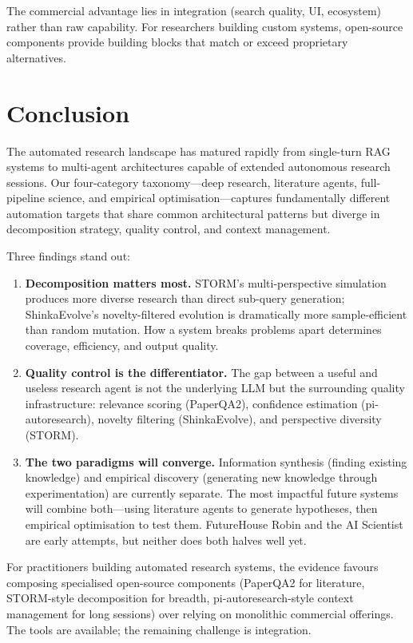 \documentclass[11pt,a4paper]{article}
\begin{document}
\noindent
The commercial advantage lies in integration (search quality, UI,
ecosystem) rather than raw capability. For researchers building custom
systems, open-source components provide building blocks that match or
exceed proprietary alternatives.

\section{Conclusion}
\label{sec:conclusion}

The automated research landscape has matured rapidly from single-turn
RAG systems to multi-agent architectures capable of extended autonomous
research sessions. Our four-category taxonomy---deep research, literature
agents, full-pipeline science, and empirical optimisation---captures
fundamentally different automation targets that share common
architectural patterns but diverge in decomposition strategy, quality
control, and context management.

Three findings stand out:

\begin{enumerate}[nosep]
  \item \textbf{Decomposition matters most.} STORM's multi-perspective
    simulation produces more diverse research than direct sub-query
    generation; ShinkaEvolve's novelty-filtered evolution is dramatically
    more sample-efficient than random mutation. How a system breaks
    problems apart determines coverage, efficiency, and output quality.
  \item \textbf{Quality control is the differentiator.} The gap between
    a useful and useless research agent is not the underlying LLM but
    the surrounding quality infrastructure: relevance scoring (PaperQA2),
    confidence estimation (pi-autoresearch), novelty filtering
    (ShinkaEvolve), and perspective diversity (STORM).
  \item \textbf{The two paradigms will converge.} Information synthesis
    (finding existing knowledge) and empirical discovery (generating new
    knowledge through experimentation) are currently separate. The most
    impactful future systems will combine both---using literature agents
    to generate hypotheses, then empirical optimisation to test them.
    FutureHouse Robin and the AI Scientist are early attempts, but
    neither does both halves well yet.
\end{enumerate}

\noindent
For practitioners building automated research systems, the evidence
favours composing specialised open-source components (PaperQA2 for
literature, STORM-style decomposition for breadth, pi-autoresearch-style
context management for long sessions) over relying on monolithic
commercial offerings. The tools are available; the remaining challenge is
integration.
\end{document}
